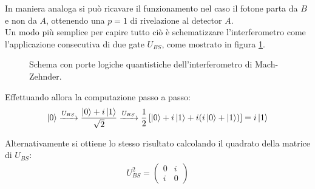 \documentclass[../../InformazioneQuantistica.tex]{subfiles}
\begin{document}
In maniera analoga si può ricavare il funzionamento nel caso il fotone parta da $B$ e non da $A$, ottenendo una $p=1$ di rivelazione al detector $A$.\\

Un modo più semplice per capire tutto ciò è schematizzare l'interferometro come l'applicazione consecutiva di due gate $U_{BS}$, come mostrato in figura \ref{fig:circuito-B.S}.

\begin{figure}[H]
\centering

\caption{Schema con porte logiche quantistiche dell'interferometro di Mach-Zehnder.\label{fig:circuito-B.S}}
\end{figure}

Effettuando allora la computazione passo a passo:
\begin{align*}
\Ket{0} \xrightarrow{U_{BS}} \frac{\Ket{0}+i\Ket{1}}{\sqrt{2}} \xrightarrow{U_{BS}} \frac{1}{2}\left[\Ket{0}+i\Ket{1}+i(i\Ket{0}+\Ket{1})\right] = i\Ket{1}
\end{align*}

Alternativamente si ottiene lo stesso risultato calcolando il quadrato della matrice di $U_{BS}$:
\begin{align*}
U_{BS}^2 = \begin{pmatrix}
0 & i\\i & 0
\end{pmatrix}
\end{align*}

\begin{comment}
\textbf{Q.A.}
\begin{itemize}
\item Una CNOT \textbf{non} effettua una misura sul bit di controllo, ma instaura una correlazione \textit{senza modificarne} lo stato quantistico
\item Si può invertire l'ordine dei gate in un circuito quantistico senza cambiare l'operatore che esso rappresenta se e solo se tali operatori commutano tra loro (nell'esempio dell'esercizio 2 della scorsa volta succede, ma è un caso particolare)
\item Prova a cercare la rappresentazione della CPHASE in termini delle altre porte logiche (CNOT e phase shift)
\end{itemize}
\end{comment}
\end{document}
